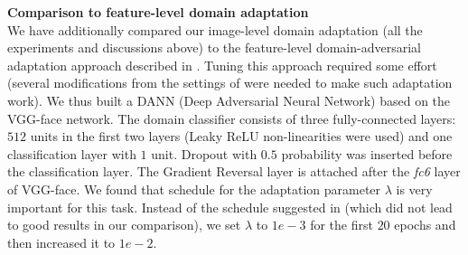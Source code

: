 




\bigskip\indent\textbf{Comparison to feature-level domain adaptation} \\
\label{sect:grl}
We have additionally compared our image-level domain adaptation (all the experiments and discussions above) to the feature-level domain-adversarial adaptation approach described in . Tuning this approach required some effort (several modifications from the settings of  were needed to make such adaptation work). We thus built a DANN (Deep Adversarial Neural Network) based on the VGG-face network. The  domain classifier consists of three fully-connected layers: $512$ units in the first two layers (Leaky ReLU \cite{HeZRS15} non-linearities were used) and one classification layer with $1$ unit. Dropout with $0.5$ probability was inserted before the classification layer. The Gradient Reversal layer is attached after the \textit{fc6} layer of VGG-face. We found that schedule for the adaptation parameter  $\lambda$ is very important for this task. Instead of the schedule suggested in  (which did not lead to good results in our comparison), we set $\lambda$ to $1e-3$ for the first $20$ epochs and then increased it to $1e-2$. 


